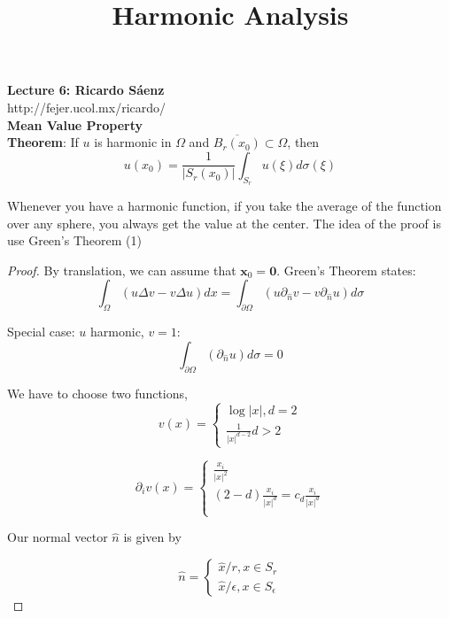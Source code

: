 \documentclass[12pt]{article}
\title{Harmonic Analysis}
\begin{document}
\noindent \textbf{Lecture 6: Ricardo S\'aenz} \\
\noindent http://fejer.ucol.mx/ricardo/ \\

\noindent \textbf{Mean Value Property} \\
\noindent \textbf{Theorem}: If $u$ is harmonic in $\Omega$ and $\overline{B_r(x_0)} \subset \Omega$, then 
$$u(x_0) = \frac{1}{\vert S_r(x_0)\vert} \int_{S_r} u(\xi)d\sigma(\xi)$$

\noindent Whenever you have a harmonic function, if you take the average of the function over any sphere, you always get the value at the center. The idea of the proof is use Green's Theorem (1)

\begin{proof}
By translation, we can assume that $\textbf{x}_0 = \textbf{0}$. Green's Theorem states:
$$\int_\Omega (u \Delta v - v \Delta u)dx = \int_{\partial \Omega} (u \partial_{\hat{n}} v - v\partial_{\hat{n}} u) d \sigma $$

\noindent  Special case: $u$ harmonic, $v=1$: 
$$\int_{\partial \Omega} (\partial_{\hat{n}}u) d \sigma = 0$$

\noindent We have to choose two functions, 
$$v(x) = \begin{cases}
\log \vert x \vert, d = 2 \\
\frac{1}{\vert x \vert^{d-2}} d>2
\end{cases} $$

$$\partial_i v(x) = \begin{cases}
\frac{x_i}{\vert x \vert^2} \\
(2-d)\frac{x_i}{\vert x \vert^d} = c_d \frac{x_i}{\vert x \vert^d} \\
\end{cases}  $$

Our normal vector $\hat{n}$ is given by

$$ \hat{n}=\begin{cases}
\hat{x}/r, x \in S_r \\
\hat{x}/\epsilon, x \in S_\epsilon
\end{cases}$$


\end{proof}
\end{document}
